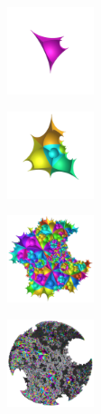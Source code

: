 \documentclass[suppldata, dvipdfmx]{interact}
\theoremstyle{plain}%
\theoremstyle{definition}
\theoremstyle{remark}
\theoremstyle{problemstyle}
\begin{document}
\begin{figure}[H]
 \begin{minipage}[t]{0.18\textwidth}
  \centering
  \includegraphics[width=1in, height=1in, keepaspectratio]{./img/constructFractal/finiteProcess/step1.png}
  \label{fig:sphaira-step1}
 \end{minipage}
 \hspace*{\fill}
 \begin{minipage}[t]{0.18\textwidth}
  \centering
  \includegraphics[width=1in, height=1in, keepaspectratio]{./img/constructFractal/finiteProcess/step2.png}
  \label{fig:sphaira-step2}
 \end{minipage}
 \hspace*{\fill}
 \begin{minipage}[t]{0.18\textwidth}
  \centering
  \includegraphics[width=1in, height=1in, keepaspectratio]{./img/constructFractal/finiteProcess/step5.png}
  \label{fig:sphaira-step5}
 \end{minipage}
 \hspace*{\fill}
 \begin{minipage}[t]{0.18\textwidth}
  \centering
  \includegraphics[width=1in, height=1in, keepaspectratio]{./img/constructFractal/finiteProcess/step10.png}
  \label{fig:sphaira-step10}
 \end{minipage}

\end{figure}
\end{document}
